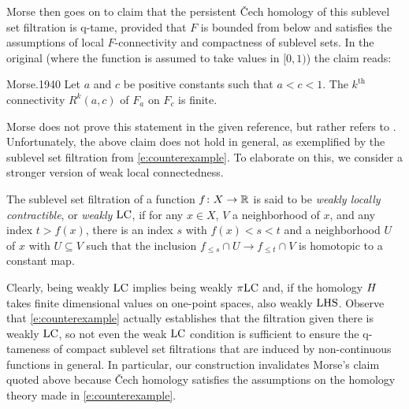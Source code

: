 Morse then goes on to claim that the persistent \v{C}ech homology of this sublevel set filtration is q-tame, provided that $F$ is bounded from below and satisfies the assumptions of local $F$-connectivity and compactness of sublevel sets.
In the original (where the function is assumed to take values in $[0,1)$) the claim reads:
\begin{displaycquote}[Theorem 6.3, p.~432]{Morse.1940}
	Let $a$ and $c$ be positive constants such that $a < c < 1$.
	The $k^{\mathrm{th}}$ connectivity $R^k(a,c)$ of $F_a$ on $F_c$ is finite.
\end{displaycquote}
Morse does not prove this statement in the given reference, but rather refers to \cite[Theorem~6.1]{Morse.1938}.
Unfortunately, the above claim does not hold in general, as exemplified by the sublevel set filtration from \cref{e:counterexample}.
To elaborate on this, we consider a stronger version of weak local connectedness.

\begin{defi}
	The sublevel set filtration of a function $f \colon X \to \mathbb{R}$ is said to be \emph{weakly locally contractible}, or \emph{weakly $\mathrm{LC}$}, if for any $x \in X$, $V$ a neighborhood of $x$, and any index $t > f(x)$, there is an index $s$ with $f(x) < s < t$ and a neighborhood $U$ of $x$ with $U \subseteq V$ such that the inclusion $f_{\leq s} \cap U \to f_{\leq t} \cap V$ is homotopic to a constant map.
\end{defi}

Clearly, being weakly $\mathrm{LC}$ implies being weakly $\pi\mathrm{LC}$ and, if the homology $H$ takes finite dimensional values on one-point spaces, also weakly $\mathrm{LHS}$.
Observe that \cref{e:counterexample} actually establishes that the filtration given there is weakly $\mathrm{LC}$, so not even the weak $\mathrm{LC}$ condition is sufficient to ensure the q-tameness of compact sublevel set filtrations that are induced by non-continuous functions in general.
In particular, our construction invalidates Morse's claim quoted above because \v{C}ech homology satisfies the assumptions on the homology theory made in \cref{e:counterexample}.

